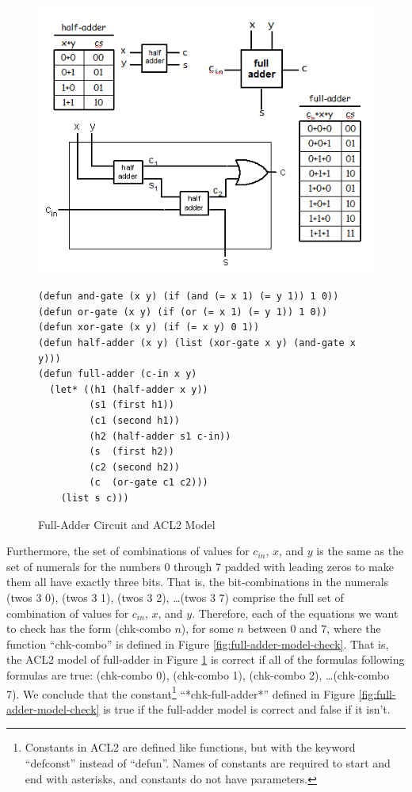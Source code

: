 \begin{figure}
\begin{center}
\includegraphics[scale=0.9]{Images/full-adder.png}
\begin{lstlisting}
(defun and-gate (x y) (if (and (= x 1) (= y 1)) 1 0))
(defun or-gate (x y) (if (or (= x 1) (= y 1)) 1 0))
(defun xor-gate (x y) (if (= x y) 0 1))
(defun half-adder (x y) (list (xor-gate x y) (and-gate x y)))
(defun full-adder (c-in x y)
  (let* ((h1 (half-adder x y))
         (s1 (first h1))
         (c1 (second h1))
         (h2 (half-adder s1 c-in))
         (s  (first h2))
         (c2 (second h2))
         (c  (or-gate c1 c2)))
    (list s c)))
\end{lstlisting}
\end{center}
\caption{Full-Adder Circuit and ACL2 Model}
\label{fig:full-adder}
\end{figure}

Furthermore, the set of combinations of values for $c_{in}$, $x$, and $y$
is the same as the set of numerals for the numbers 0 through 7
padded with leading zeros to make them all have exactly three bits.
That is, the bit-combinations in the numerals
(twos 3 0), (twos 3 1), (twos 3 2), \dots (twos 3 7) comprise
the full set of combination of values for $c_{in}$, $x$, and $y$.
Therefore, each of the equations we want to check
has the form (chk-combo $n$), for some $n$ between 0 and 7,
where the function ``chk-combo'' is defined in
Figure \ref{fig:full-adder-model-check}.
That is, the ACL2 model of full-adder in Figure \ref{fig:full-adder}
is correct if all of the formulas following formulas are true:
(chk-combo 0), (chk-combo 1), (chk-combo 2), \dots (chk-combo 7).
We conclude that the constant\footnote{Constants in ACL2
are defined like functions, but with the keyword ``defconst'' instead
of ``defun''. Names of constants are required to start and end with asterisks,
and constants do not have parameters.}
``*chk-full-adder*'' defined in
Figure \ref{fig:full-adder-model-check} is true if the full-adder model
is correct and false if it isn't.

